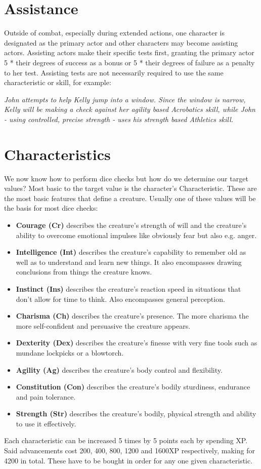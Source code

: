 \documentclass[12pt,a4paper,openany,usenames,dvipsnames]{book}
\begin{document}
	\section{Assistance}
	Outside of combat, especially during extended actions, one character is designated as the primary actor and other characters may become assisting actors. Assisting actors make their specific tests first, granting the primary actor 5 * their degrees of success as a bonus or 5 * their degrees of failure as a penalty to her test. Assisting tests are not necessarily required to use the same characteristic or skill, for example:\par
	\begin{exampleblock}
		\itshape
		John attempts to help Kelly jump into a window. Since the window is narrow, Kelly will be making a check against her agility based Acrobatics skill, while John - using controlled, precise strength - uses his strength based Athletics skill.
	\end{exampleblock}

	\section{Characteristics}
	We now know how to perform dice checks but how do we determine our target values? Most basic to the target value is the character’s Characteristic. These are the most basic features that define a creature. Usually one of these values will be the basis for most dice checks:
	\begin{itemize}
		\setlength\itemsep{-8mm}
		\item \textbf{Courage (Cr)} describes the creature’s strength of will and the creature’s ability to overcome emotional impulses like obviously fear but also e.g. anger.
		\item \textbf{Intelligence (Int)} describes the creature’s capability to remember old as well as to understand and learn new things. It also encompasses drawing conclusions from things the creature knows.
		\item \textbf{Instinct (Ins)} describes the creature’s reaction speed in situations that don’t allow for time to think. Also encompasses general perception.
		\item \textbf{Charisma (Ch)} describes the creature’s presence. The more charisma the more self-confident and persuasive the creature appears.
		\item \textbf{Dexterity (Dex)} describes the creature’s finesse with very fine tools such as mundane lockpicks or a blowtorch.
		\item \textbf{Agility (Ag)} describes the creature’s body control and flexibility.
		\item \textbf{Constitution (Con)} describes the creature’s bodily sturdiness, endurance and pain tolerance.
		\item \textbf{Strength (Str)} describes the creature’s bodily, physical strength and ability to use it effectively.
	\end{itemize}
	Each characteristic can be increased 5 times by 5 points each by spending XP. Said advancements cost 200, 400, 800, 1200 and 1600XP respectively, making for 4200 in total. These have to be bought in order for any one given characteristic.
	
\end{document}
